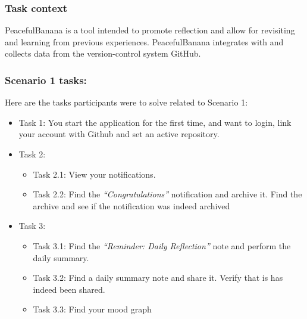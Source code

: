\subsubsection{Task context}
PeacefulBanana is a tool intended to promote reflection and allow for revisiting and learning from previous experiences. PeacefulBanana integrates with and collects data from the version-control system GitHub.
\subsubsection{Scenario 1 tasks:}
Here are the tasks participants were to solve related to Scenario 1:
\begin{itemize}
	\item Task 1: You start the application for the first time, and want to login, link your account with Github and set an active repository.
	\item Task 2: 
		\begin{itemize}
			\item Task 2.1: View your notifications.
			\item Task 2.2: Find the \emph{“Congratulations”} notification and archive it. Find the archive and see if the notification was indeed archived
		\end{itemize}
	\item Task 3:
		\begin{itemize}
			\item Task 3.1: Find the \emph{“Reminder: Daily Reflection”} note and perform the daily summary.
			\item Task 3.2: Find a daily summary note and share it. Verify that is has indeed been shared.
			\item Task 3.3: Find your mood graph
		\end{itemize}
\end{itemize}

